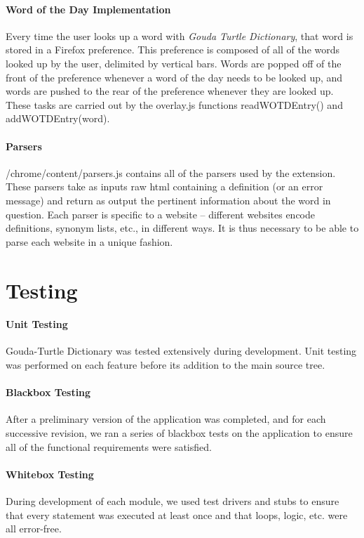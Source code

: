 \documentclass{article}
\begin{document}
\paragraph{Word of the Day Implementation}

Every time the user looks up a word with \emph{Gouda Turtle Dictionary}, that word is stored in a Firefox preference. This preference is composed of all of the words looked up by the user, delimited by vertical bars. Words are popped off of the front of the preference whenever a word of the day needs to be looked up, and words are pushed to the rear of the preference whenever they are looked up. These tasks are carried out by the overlay.js functions readWOTDEntry() and addWOTDEntry(word).

\paragraph{Parsers}
/chrome/content/parsers.js contains all of the parsers used by the extension. These parsers take as inputs raw html containing a definition (or an error message) and return as output the pertinent information about the word in question. Each parser is specific to a website -- different websites encode definitions, synonym lists, etc., in different ways. It is thus necessary to be able to parse each website in a unique fashion.

\section{Testing}
\paragraph{Unit Testing}
Gouda-Turtle Dictionary was tested extensively during development. Unit testing
was performed on each feature before its addition to the main source tree.

\paragraph{Blackbox Testing}
After a preliminary version of the application was completed, and for each
successive revision, we ran a series of blackbox tests on the application to
ensure all of the functional requirements were satisfied.

\paragraph{Whitebox Testing}
During development of each module, we used test drivers and stubs to ensure
that every statement was executed at least once and that loops, logic, etc.
were all error-free.
\end{document}
